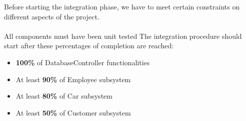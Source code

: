 Before starting the integration phase, we have to meet certain constraints on different aspects of the project.
\\\\
All components must have been unit tested
The integration procedure should start after these percentages of completion are reached:
\begin{itemize}
\item \textbf{100\%} of DatabaseController functionalities
\item At least \textbf{90\%} of Employee subsystem
\item At least \textbf{80\%} of Car subsystem
\item At least \textbf{50\%} of Customer subsystem
\end{itemize}